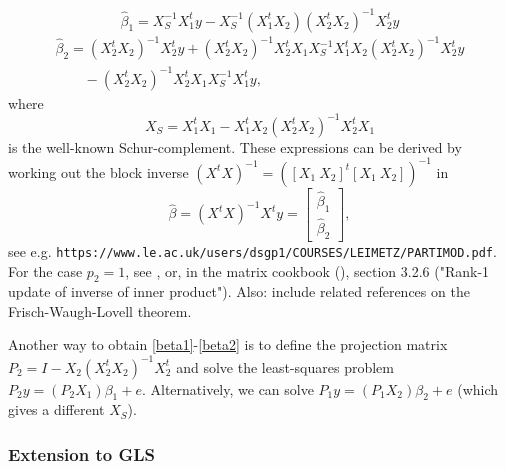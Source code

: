 \documentclass[12pt]{article}
\begin{document}
\begin{equation} \label{beta1}
\hat \beta_1 = X_S^{-1} X_1^t y   - X_S^{-1} (X_1^t X_2) (X_2^t X_2)^{-1} X_2^t y
\end{equation}
\begin{equation} \label{beta2}
\begin{split}
\hat \beta_2 = (X_2^t X_2)^{-1} X_2^t y + (X_2^t X_2)^{-1} X_2^t X_1 X_S^{-1} X_1^t X_2 (X_2^t X_2)^{-1} X_2^t y \\
\quad \quad - (X_2^t X_2)^{-1} X_2^t X_1 X_S^{-1} X_1^t  y,
\end{split}
\end{equation}
%
where 
\begin{equation}\label{XS}
X_S = X_1^t X_1 - X_1^t X_2 (X_2^t X_2)^{-1} X_2^t X_1
\end{equation}
is the well-known Schur-complement. These expressions can be derived by working out the block inverse $(X^t X)^{-1} = ([X_1 \: X_2]^t [X_1 \: X_2])^{-1}$ in
%
\begin{equation} \label{beta}
\hat \beta = (X^t X)^{-1} X^t y = \left[\begin{array}{c}
\hat \beta_1 \\
\hat \beta_2
\end{array}
\right],
\end{equation}
see e.g. \verb|https://www.le.ac.uk/users/dsgp1/COURSES/LEIMETZ/PARTIMOD.pdf|.
For the case $p_2=1$, see \cite{jones_1970_recursive}, or, in the matrix cookbook (\cite{petersen2008matrix}), section 3.2.6 ("Rank-1 update of inverse of inner product"). Also: include related references on the Frisch-Waugh-Lovell theorem.

Another way to obtain \eqref{beta1}-\eqref{beta2} is to define the projection matrix $P_2 = I - X_2 (X_2^t X_2)^{-1} X_2^t$ and solve the least-squares problem $P_2 y = (P_2 X_1) \beta_1 + e$. Alternatively, we can solve $P_1 y = (P_1 X_2) \beta_2 + e$ (which gives a different $X_S$). 

\subsubsection{Extension to GLS} \label{gls}
\end{document}
